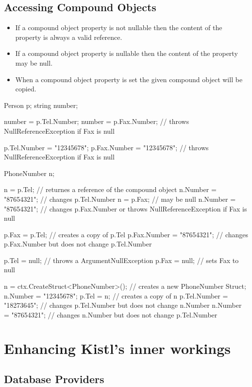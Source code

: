 \subsection{Accessing Compound Objects}

\begin{itemize}
	\item{If a compound object property is not nullable then the content of the property is always a valid reference.}
	\item{If a compound object property is  nullable then the content of the property may be null.}
	\item{When a compound object property is set the given compound object will be copied.}
\end{itemize}

\begin{CS}
Person p;
string number;

number = p.Tel.Number;
number = p.Fax.Number; // throws NullReferenceException if Fax is null

p.Tel.Number = "12345678";
p.Fax.Number = "12345678"; // throws NullReferenceException if Fax is null

PhoneNumber n;

n = p.Tel; // returnes a reference of the compound object
n.Number = "87654321"; // changes p.Tel.Number
n = p.Fax; // may be null
n.Number = "87654321"; // changes p.Fax.Number or throws NullReferenceException if Fax is null

p.Fax = p.Tel; // creates a copy of p.Tel
p.Fax.Number = "87654321"; // changes p.Fax.Number but does not change p.Tel.Number

p.Tel = null; // throws a ArgumentNullException
p.Fax = null; // sets Fax to null

n = ctx.CreateStruct<PhoneNumber>(); // creates a new PhoneNumber Struct;
n.Number = "12345678";
p.Tel = n; // creates a copy of n
p.Tel.Number = "18273645"; // changes p.Tel.Number but does not change n.Number
n.Number = "87654321"; // changes n.Number but does not change p.Tel.Number
\end{CS}

\section{Enhancing Kistl's inner workings}

\subsection{Database Providers}


